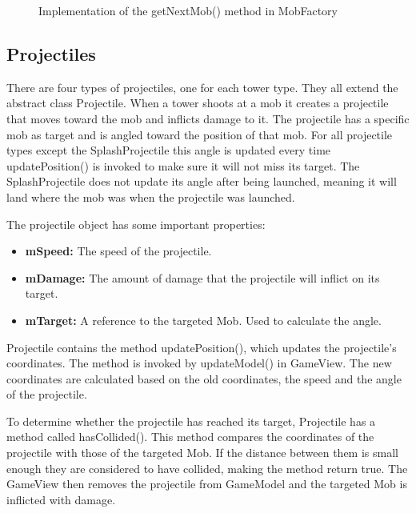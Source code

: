 \begin{figure}[htb]

\begin{small}

\end{small}

\caption{Implementation of the getNextMob() method in MobFactory}
\label{fig:codeExWaveDelay}

\end{figure}

\subsection{Projectiles}

There are four types of projectiles, one for each tower type. They all extend the abstract class Projectile. When a tower shoots at a mob it creates a projectile that moves toward the mob and inflicts damage to it. The projectile has a specific mob as target and is angled toward the position of that mob. For all projectile types except the SplashProjectile this angle is updated every time updatePosition() is invoked to make sure it will not miss its target. The SplashProjectile does not update its angle after being launched, meaning it will land where the mob was when the projectile was launched.

The projectile object has some important properties:

\begin{itemize}
\item {\bf mSpeed:} The speed of the projectile.
\item {\bf mDamage:} The amount of damage that the projectile will inflict on its target.
\item {\bf mTarget:} A reference to the targeted Mob. Used to calculate the angle.
\end{itemize}

Projectile contains the method updatePosition(), which updates the projectile's coordinates. The method is invoked by updateModel() in GameView. The new coordinates are calculated based on the old coordinates, the speed and the angle of the projectile.

To determine whether the projectile has reached its target, Projectile has a method called hasCollided(). This method compares the coordinates of the projectile with those of the targeted Mob. If the distance between them is small enough they are considered to have collided, making the method return true. The GameView then removes the projectile from GameModel and the targeted Mob is inflicted with damage.

